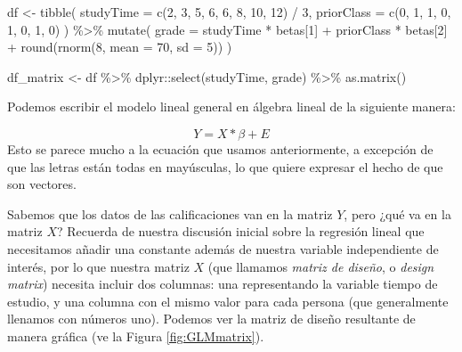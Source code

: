 \documentclass[
  12pt,
]{book}
\newenvironment{Shaded}{\begin{snugshade}}{\end{snugshade}}
\newcommand{\AttributeTok}[1]{\textcolor[rgb]{0.77,0.63,0.00}{#1}}
\newcommand{\DecValTok}[1]{\textcolor[rgb]{0.00,0.00,0.81}{#1}}
\newcommand{\FunctionTok}[1]{\textcolor[rgb]{0.00,0.00,0.00}{#1}}
\newcommand{\NormalTok}[1]{#1}
\newcommand{\OtherTok}[1]{\textcolor[rgb]{0.56,0.35,0.01}{#1}}
\newcommand{\SpecialCharTok}[1]{\textcolor[rgb]{0.00,0.00,0.00}{#1}}
\begin{document}
\begin{Shaded}
\begin{Highlighting}[]
\NormalTok{df }\OtherTok{\textless{}{-}}
  \FunctionTok{tibble}\NormalTok{(}
    \AttributeTok{studyTime =} \FunctionTok{c}\NormalTok{(}\DecValTok{2}\NormalTok{, }\DecValTok{3}\NormalTok{, }\DecValTok{5}\NormalTok{, }\DecValTok{6}\NormalTok{, }\DecValTok{6}\NormalTok{, }\DecValTok{8}\NormalTok{, }\DecValTok{10}\NormalTok{, }\DecValTok{12}\NormalTok{) }\SpecialCharTok{/} \DecValTok{3}\NormalTok{,}
    \AttributeTok{priorClass =} \FunctionTok{c}\NormalTok{(}\DecValTok{0}\NormalTok{, }\DecValTok{1}\NormalTok{, }\DecValTok{1}\NormalTok{, }\DecValTok{0}\NormalTok{, }\DecValTok{1}\NormalTok{, }\DecValTok{0}\NormalTok{, }\DecValTok{1}\NormalTok{, }\DecValTok{0}\NormalTok{)}
\NormalTok{  ) }\SpecialCharTok{\%\textgreater{}\%}
  \FunctionTok{mutate}\NormalTok{(}
    \AttributeTok{grade =} 
\NormalTok{      studyTime }\SpecialCharTok{*}\NormalTok{ betas[}\DecValTok{1}\NormalTok{] }\SpecialCharTok{+} 
\NormalTok{      priorClass }\SpecialCharTok{*}\NormalTok{ betas[}\DecValTok{2}\NormalTok{] }\SpecialCharTok{+} 
      \FunctionTok{round}\NormalTok{(}\FunctionTok{rnorm}\NormalTok{(}\DecValTok{8}\NormalTok{, }\AttributeTok{mean =} \DecValTok{70}\NormalTok{, }\AttributeTok{sd =} \DecValTok{5}\NormalTok{))}
\NormalTok{  )}

\NormalTok{df\_matrix }\OtherTok{\textless{}{-}} 
\NormalTok{  df }\SpecialCharTok{\%\textgreater{}\%}
\NormalTok{  dplyr}\SpecialCharTok{::}\FunctionTok{select}\NormalTok{(studyTime, grade) }\SpecialCharTok{\%\textgreater{}\%}
  \FunctionTok{as.matrix}\NormalTok{()}
\end{Highlighting}
\end{Shaded}

Podemos escribir el modelo lineal general en álgebra lineal de la siguiente manera:

\[
Y = X*\beta + E
\]
Esto se parece mucho a la ecuación que usamos anteriormente, a excepción de que las letras están todas en mayúsculas, lo que quiere expresar el hecho de que son vectores.

Sabemos que los datos de las calificaciones van en la matriz \(Y\), pero ¿qué va en la matriz \(X\)? Recuerda de nuestra discusión inicial sobre la regresión lineal que necesitamos añadir una constante además de nuestra variable independiente de interés, por lo que nuestra matriz \(X\) (que llamamos \emph{matriz de diseño}, o \emph{design matrix}) necesita incluir dos columnas: una representando la variable tiempo de estudio, y una columna con el mismo valor para cada persona (que generalmente llenamos con números uno). Podemos ver la matriz de diseño resultante de manera gráfica (ve la Figura \ref{fig:GLMmatrix}).
\end{document}
